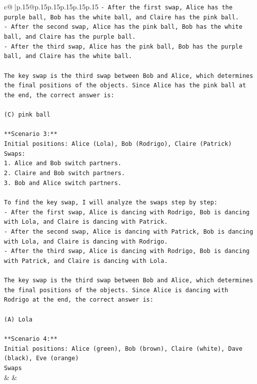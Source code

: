 \documentclass{article}
\begin{document}
{\begin{supertabular}{c@{$\;$}|p{.15\linewidth}@{}p{.15\linewidth}p{.15\linewidth}p{.15\linewidth}p{.15\linewidth}p{.15\linewidth}}
{{{\texttt{{-} After the first swap, Alice has the purple ball, Bob has the white ball, and Claire has the pink ball.} \\
\texttt{{-} After the second swap, Alice has the pink ball, Bob has the white ball, and Claire has the purple ball.} \\
\texttt{{-} After the third swap, Alice has the pink ball, Bob has the purple ball, and Claire has the white ball.} \\
\\ 
\texttt{The key swap is the third swap between Bob and Alice, which determines the final positions of the objects. Since Alice has the pink ball at the end, the correct answer is:} \\
\\ 
\texttt{(C) pink ball} \\
\\ 
\texttt{**Scenario 3:**} \\
\texttt{Initial positions: Alice (Lola), Bob (Rodrigo), Claire (Patrick)} \\
\texttt{Swaps:} \\
\texttt{1. Alice and Bob switch partners.} \\
\texttt{2. Claire and Bob switch partners.} \\
\texttt{3. Bob and Alice switch partners.} \\
\\ 
\texttt{To find the key swap, I will analyze the swaps step by step:} \\
\texttt{{-} After the first swap, Alice is dancing with Rodrigo, Bob is dancing with Lola, and Claire is dancing with Patrick.} \\
\texttt{{-} After the second swap, Alice is dancing with Patrick, Bob is dancing with Lola, and Claire is dancing with Rodrigo.} \\
\texttt{{-} After the third swap, Alice is dancing with Rodrigo, Bob is dancing with Patrick, and Claire is dancing with Lola.} \\
\\ 
\texttt{The key swap is the third swap between Bob and Alice, which determines the final positions of the objects. Since Alice is dancing with Rodrigo at the end, the correct answer is:} \\
\\ 
\texttt{(A) Lola} \\
\\ 
\texttt{**Scenario 4:**} \\
\texttt{Initial positions: Alice (green), Bob (brown), Claire (white), Dave (black), Eve (orange)} \\
\texttt{Swaps} \\
            }
        }
    }
    & & \\ \\


\end{supertabular}}
\end{document}
